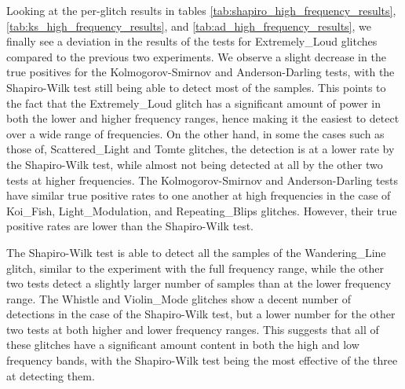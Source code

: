 \documentclass[12pt]{article}
\begin{document}
\noindent Looking at the per-glitch results in tables \ref{tab:shapiro_high_frequency_results}, \ref{tab:ks_high_frequency_results}, and \ref{tab:ad_high_frequency_results}, we finally see a deviation in the results of the tests for Extremely\_Loud glitches compared to the previous two experiments. We observe a slight decrease in the true positives for the Kolmogorov-Smirnov and Anderson-Darling tests, with the Shapiro-Wilk test still being able to detect most of the samples. This points to the fact that the Extremely\_Loud glitch has a significant amount of power in both the lower and higher frequency ranges, hence making it the easiest to detect over a wide range of frequencies. On the other hand, in some the cases such as those of, Scattered\_Light and Tomte glitches, the detection is at a lower rate by the Shapiro-Wilk test, while almost not being detected at all by the other two tests at higher frequencies. The Kolmogorov-Smirnov and Anderson-Darling tests have similar true positive rates to one another at high frequencies in the case of Koi\_Fish, Light\_Modulation, and Repeating\_Blips glitches. However, their true positive rates are lower than the Shapiro-Wilk test.

\pagebreak
\noindent The Shapiro-Wilk test is able to detect all the samples of the Wandering\_Line glitch, similar to the experiment with the full frequency range, while the other two tests detect a slightly larger number of samples than at the lower frequency range. The Whistle and Violin\_Mode glitches show a decent number of detections in the case of the Shapiro-Wilk test, but a lower number for the other two tests at both higher and lower frequency ranges. This suggests that all of these glitches have a significant amount content in both the high and low frequency bands, with the Shapiro-Wilk test being the most effective of the three at detecting them.
\end{document}
